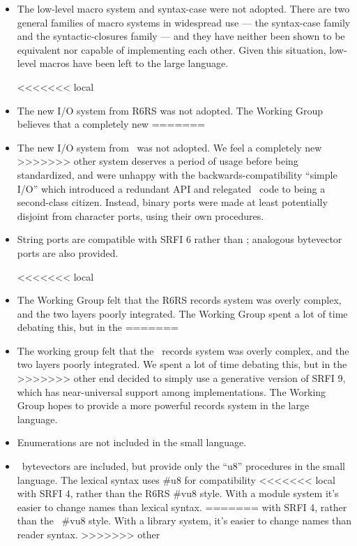 \begin{itemize}

\item The low-level macro system and {\cf syntax-case} were not adopted. There
are two general families of macro systems in widespread use --- the
{\cf syntax-case} family and the {\cf syntactic-closures} family --- and they have
neither been shown to be equivalent nor capable of implementing each
other. Given this situation,
low-level macros have been left to the large language.

<<<<<<< local
\item The new I/O system from R6RS was not adopted. The Working Group believes that a completely new
=======
\item The new I/O system from \rsixrs\ was not adopted. We feel a completely new
>>>>>>> other
system deserves a period of usage before being standardized, and were
unhappy with the backwards-compatibility ``simple I/O'' which introduced
a redundant API and relegated \rfivers\ code to being a second-class
citizen.  Instead, binary ports were made at least potentially disjoint from
character ports, using their own procedures.

\item String ports are compatible with SRFI 6 rather than \rsixrs; analogous
bytevector ports are also provided.

<<<<<<< local
\item The Working Group felt that the R6RS records system was overly complex, and the two layers
poorly integrated. The Working Group spent a lot of time debating this, but in the
=======
\item The working group felt that the \rsixrs\ records system was overly complex, and the two layers
poorly integrated. We spent a lot of time debating this, but in the
>>>>>>> other
end decided to simply use a generative version of SRFI 9, which has
near-universal support among implementations. The Working Group hopes to provide a more
powerful records system in the large language.

\item Enumerations are not included in the small language.

\item \rsixrs~bytevectors are included, but provide only the ``u8'' procedures in the small
language.  The lexical syntax uses {\cf \#u8} for compatibility
<<<<<<< local
with SRFI 4, rather than the R6RS {\cf \#vu8} style.
With a module system it's easier to change names than lexical syntax.
=======
with SRFI 4, rather than the \rsixrs~{\cf \#vu8} style.
With a library system, it's easier to change names than reader syntax.
>>>>>>> other


\end{itemize}
